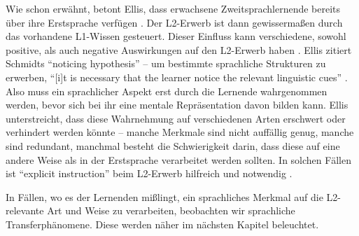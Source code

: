 Wie schon erwähnt, betont Ellis, dass erwachsene Zweitsprachlernende bereits über ihre Erstsprache verfügen \cite[S.72]{Ellis08}.
Der L2-Erwerb ist dann gewissermaßen durch das vorhandene L1-Wissen gesteuert.
Dieser Einfluss kann verschiedene, sowohl positive, als auch negative Auswirkungen auf den L2-Erwerb haben \cite[S.72]{Ellis08}.
Ellis zitiert Schmidts ``noticing hypothesis'' -- um bestimmte sprachliche Strukturen zu erwerben, ``[i]t is necessary that the learner notice the relevant linguistic cues'' \cite[S.61]{Ellis04}.
Also muss ein sprachlicher Aspekt erst durch die Lernende wahrgenommen werden, bevor sich bei ihr eine mentale Repräsentation davon bilden kann.
Ellis unterstreicht, dass diese Wahrnehmung auf verschiedenen Arten erschwert oder verhindert werden könnte --
manche Merkmale sind nicht auffällig genug,
manche sind redundant,
manchmal besteht die Schwierigkeit darin, dass diese auf eine andere Weise als in der Erstsprache verarbeitet werden sollten.
In solchen Fällen ist ``explicit instruction'' beim L2-Erwerb hilfreich und notwendig \cite[vgl.][S.62]{Ellis04}.

In Fällen, wo es der Lernenden mißlingt, ein sprachliches Merkmal auf die L2-relevante Art und Weise zu verarbeiten, beobachten wir sprachliche Transferphänomene.
Diese werden näher im nächsten Kapitel beleuchtet.







